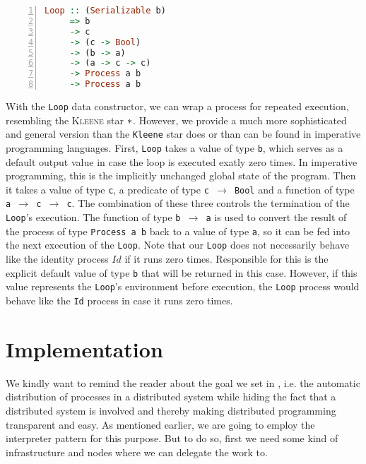\begin{lstlisting}[language=Haskell,caption=Signature of the \texttt{Loop} type constructor.,numbers=left,frame=bt]
Loop :: (Serializable b)
     => b
     -> c
     -> (c -> Bool)
     -> (b -> a)
     -> (a -> c -> c)
     -> Process a b
     -> Process a b
\end{lstlisting}
With the \texttt{Loop} data constructor, we can wrap a process for repeated execution, resembling the \textsc{Kleene} star $*$. However, we provide a much more sophisticated and general version than the \texttt{Kleene} star does or than can be found in imperative programming languages. First, \texttt{Loop} takes a value of type \texttt{b}, which serves as a default output value in case the loop is executed exatly zero times. In imperative programming, this is the implicitly unchanged global state of the program. Then it takes a value of type \texttt{c}, a predicate of type \texttt{c $\to$ Bool} and a function of type \texttt{a $\to$ c $\to$ c}. The combination of these three controls the termination of the \texttt{Loop}'s execution. The function of type \texttt{b $\to$ a} is used to convert the result of the process of type \texttt{Process a b} back to a value of type \texttt{a}, so it can be fed into the next execution of the \texttt{Loop}. Note that our \texttt{Loop} does not necessarily behave like the identity process $Id$ if it runs zero times. Responsible for this is the explicit default value of type \texttt{b} that will be returned in this case. However, if this value represents the \texttt{Loop}'s environment before execution, the \texttt{Loop} process would behave like the \texttt{Id} process in case it runs zero times. 

\section{Implementation}
\label{chp:implementation}
We kindly want to remind the reader about the goal we set in , i.e. the automatic distribution of processes in a distributed system while hiding the fact that a distributed system is involved and thereby making distributed programming transparent and easy. As mentioned earlier, we are going to employ the interpreter pattern \cite{Gamma:1995:DPE:186897} for this purpose. But to do so, first we need some kind of infrastructure and nodes where we can delegate the work to.

